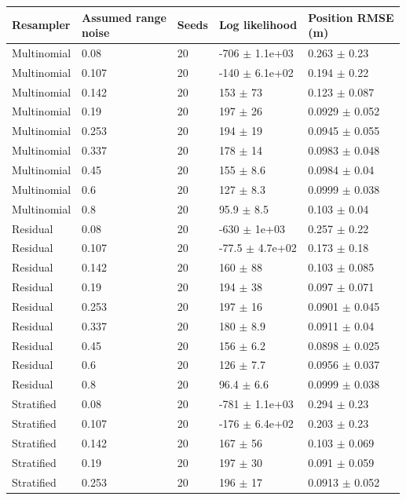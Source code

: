 \begin{tabular}{lllll}
\toprule
Resampler & \shortstack[l]{Assumed range\\noise} & Seeds & Log likelihood & \shortstack[l]{Position RMSE\\(m)} \\
\midrule
Multinomial & 0.08 & 20 & -706 $\pm$ 1.1e+03 & 0.263 $\pm$ 0.23 \\
Multinomial & 0.107 & 20 & -140 $\pm$ 6.1e+02 & 0.194 $\pm$ 0.22 \\
Multinomial & 0.142 & 20 & 153 $\pm$ 73 & 0.123 $\pm$ 0.087 \\
Multinomial & 0.19 & 20 & 197 $\pm$ 26 & 0.0929 $\pm$ 0.052 \\
Multinomial & 0.253 & 20 & 194 $\pm$ 19 & 0.0945 $\pm$ 0.055 \\
Multinomial & 0.337 & 20 & 178 $\pm$ 14 & 0.0983 $\pm$ 0.048 \\
Multinomial & 0.45 & 20 & 155 $\pm$ 8.6 & 0.0984 $\pm$ 0.04 \\
Multinomial & 0.6 & 20 & 127 $\pm$ 8.3 & 0.0999 $\pm$ 0.038 \\
Multinomial & 0.8 & 20 & 95.9 $\pm$ 8.5 & 0.103 $\pm$ 0.04 \\
Residual & 0.08 & 20 & -630 $\pm$ 1e+03 & 0.257 $\pm$ 0.22 \\
Residual & 0.107 & 20 & -77.5 $\pm$ 4.7e+02 & 0.173 $\pm$ 0.18 \\
Residual & 0.142 & 20 & 160 $\pm$ 88 & 0.103 $\pm$ 0.085 \\
Residual & 0.19 & 20 & 194 $\pm$ 38 & 0.097 $\pm$ 0.071 \\
Residual & 0.253 & 20 & 197 $\pm$ 16 & 0.0901 $\pm$ 0.045 \\
Residual & 0.337 & 20 & 180 $\pm$ 8.9 & 0.0911 $\pm$ 0.04 \\
Residual & 0.45 & 20 & 156 $\pm$ 6.2 & 0.0898 $\pm$ 0.025 \\
Residual & 0.6 & 20 & 126 $\pm$ 7.7 & 0.0956 $\pm$ 0.037 \\
Residual & 0.8 & 20 & 96.4 $\pm$ 6.6 & 0.0999 $\pm$ 0.038 \\
Stratified & 0.08 & 20 & -781 $\pm$ 1.1e+03 & 0.294 $\pm$ 0.23 \\
Stratified & 0.107 & 20 & -176 $\pm$ 6.4e+02 & 0.203 $\pm$ 0.23 \\
Stratified & 0.142 & 20 & 167 $\pm$ 56 & 0.103 $\pm$ 0.069 \\
Stratified & 0.19 & 20 & 197 $\pm$ 30 & 0.091 $\pm$ 0.059 \\
Stratified & 0.253 & 20 & 196 $\pm$ 17 & 0.0913 $\pm$ 0.052 \\

\end{tabular}
